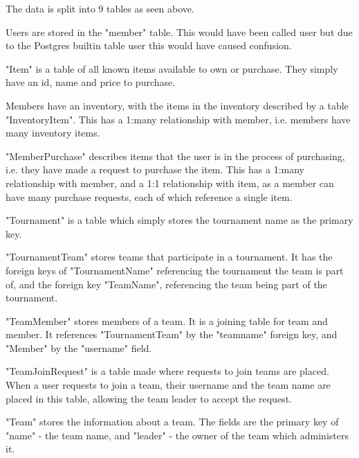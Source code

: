 
The data is split into 9 tables as seen above.

Users are stored in the "member" table. This would have been called user but due to the Postgres builtin table user this would have caused confusion.

"Item" is a table of all known items available to own or purchase. They simply have an id, name and price to purchase.

Members have an inventory, with the items in the inventory described by a table "InventoryItem". This has a 1:many relationship with member, i.e. members have many inventory items.

"MemberPurchase" describes items that the user is in the process of purchasing, i.e. they have made a request to purchase the item. This has a 1:many relationship with member, and a 1:1 relationship with item, as a member can have many purchase requests, each of which reference a single item.

"Tournament" is a table which simply stores the tournament name as the primary key.

"TournamentTeam" stores teams that participate in a tournament. It has the foreign keys of "TournamentName" referencing the tournament the team is part of, and the foreign key "TeamName", referencing the team being part of the tournament.

"TeamMember" stores members of a team. It is a joining table for team and member. It references "TournamentTeam" by the "teamname" foreign key, and "Member" by the "username" field.

"TeamJoinRequest" is a table made where requests to join teams are placed. When a user requests to join a team, their username and the team name are placed in this table, allowing the team leader to accept the request.

"Team" stores the information about a team. The fields are the primary key of "name" - the team name, and "leader" - the owner of the team which administers it.
